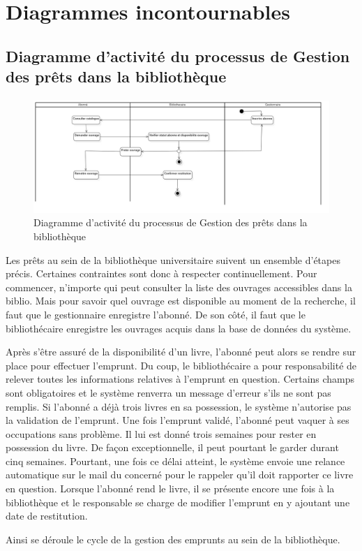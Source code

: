 \section{Diagrammes incontournables}
\subsection{Diagramme d’activité du processus de Gestion des prêts dans la bibliothèque}
\paragraph{}
\begin{figure}[h]
        \centering
        \includegraphics[width=1\textwidth]{ActivityDiagram1}
        \caption{Diagramme d’activité du processus de Gestion des prêts dans la bibliothèque}
        \label{image-ActivityDiagram1}
        \end{figure}
\par
Les prêts au sein de la bibliothèque universitaire suivent un ensemble d'étapes précis.
Certaines contraintes sont donc à respecter continuellement. Pour commencer, n'importe qui 
peut consulter la liste des ouvrages accessibles dans la biblio. Mais pour savoir quel 
ouvrage est disponible au moment de la recherche, il faut que le gestionnaire enregistre 
l'abonné. De son côté, il faut que le bibliothécaire enregistre les ouvrages acquis 
dans la base de données du système. \par 
Après s'être assuré de la disponibilité d'un livre, l'abonné peut alors se rendre sur 
place pour effectuer l'emprunt. Du coup, le bibliothécaire a pour responsabilité de relever
toutes les informations relatives à l'emprunt en question. Certains champs sont obligatoires
et le système renverra un message d'erreur s'ils ne sont pas remplis. Si l'abonné a déjà 
trois livres en sa possession, le système n'autorise pas la validation de l'emprunt.
Une fois l'emprunt validé, l'abonné peut vaquer à ses occupations sans problème. Il lui 
est donné trois semaines pour rester en possession du livre. De façon exceptionnelle, il 
peut pourtant le garder durant cinq semaines. Pourtant, une fois ce délai atteint, le 
système envoie une relance automatique sur le mail du concerné pour le rappeler qu'il doit 
rapporter ce livre en question.
Lorsque l'abonné rend le livre, il se présente encore une fois à la bibliothèque et le 
responsable se charge de modifier l'emprunt en y ajoutant une date de restitution. \par 
Ainsi se déroule le cycle de la gestion des emprunts au sein de la bibliothèque.
